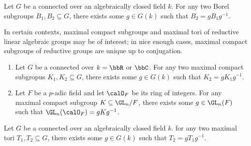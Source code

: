











\begin{proposition}
    Let $G$ be a connected  over an algebraically closed field $k$. For any two Borel subgroups $B_1,B_2 \subseteq G$, there exists some $g \in G(k)$ such that $B_2 = gB_1g^{-1}$.
\end{proposition}

In certain contexts, maximal compact subgroups and maximal tori of reductive linear algebraic groups may be of interest; in nice enough cases, maximal compact subgroups of reductive groups are unique up to conjugation.

\begin{proposition}
    \begin{enumerate}
        \item Let $G$ be a connected  over $k = \bbR$ or $\bbC$. For any two maximal compact subgropus $K_1,K_2 \subseteq G$, there exists some $g \in G(k)$ such that $K_2 = gK_1 g^{-1}$.

        \item Let $F$ be a $p$-adic field and let $\calO_F$ be its ring of integers. For any maximal compact subgroup $K \subseteq \GL_n/F$, there exists some $g \in \GL_n(F)$ such that $\GL_n(\calO_F) = g K g^{-1}$.

    \end{enumerate}
\end{proposition}

\begin{proposition}
Let $G$ be a connected  over an algebraically closed field $k$. for any two maximal tori $T_1,T_2 \subseteq G$, there exists some $g \in G(k)$ such that $T_2 = gT_1 g^{-1}$.
\end{proposition}

